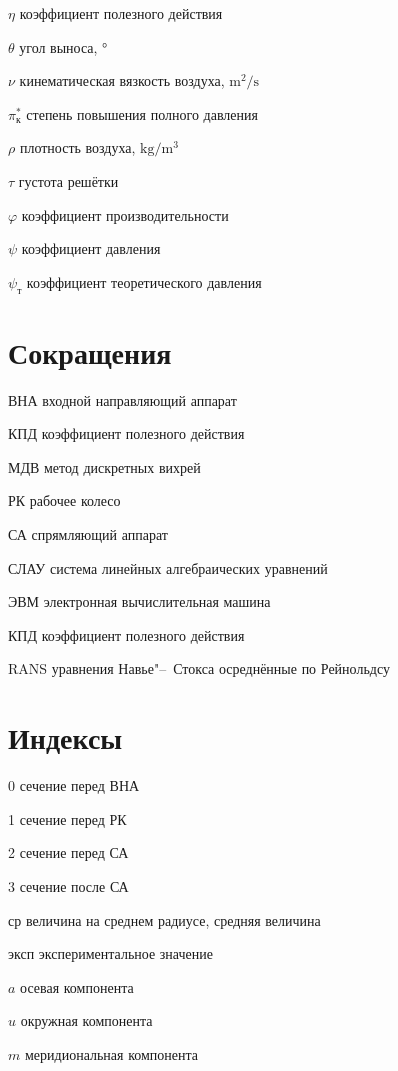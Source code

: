 \begin{eqexpl}[10mm]
\item{\(\eta\)} коэффициент полезного действия
\item{\(\theta\)} угол выноса, \(\si\degree\)
\item{\(\nu\)} кинематическая вязкость воздуха, $\si\meter^2/\si\second$
\item{\(\pi^{*}_\text{к}\)} степень повышения полного давления
\item{\(\rho\)} плотность воздуха, \(\si{\kilogram}/\si{\meter}^3\)
\item{\(\tau\)} густота решётки
\item{\(\varphi\)} коэффициент производительности
\item{\(\psi\)}	коэффициент давления
\item{\(\psi_{\text{т}}\)} коэффициент теоретического давления
\end{eqexpl}

\section*{Сокращения}
\begin{eqexpl}
	\item{ВНА} входной направляющий аппарат
	\item{КПД} коэффициент полезного действия
	\item{МДВ} метод дискретных вихрей
	\item{РК} рабочее колесо
	\item{СА} спрямляющий аппарат
	\item{СЛАУ} система линейных алгебраических уравнений
	\item{ЭВМ} электронная вычислительная машина
	\item{КПД} коэффициент полезного действия
	\item{RANS} уравнения Навье"--~Стокса осреднённые по Рейнольдсу
\end{eqexpl}

\section*{Индексы}
\begin{eqexpl}
	\item{0} сечение перед ВНА
	\item{1} сечение перед РК
	\item{2} сечение перед СА
	\item{3} сечение после СА
	\item{ср} величина на среднем радиусе, средняя величина
	\item{эксп} экспериментальное значение
	\item{\(a\)} осевая компонента
	\item{\(u\)} окружная компонента
	\item{\(m\)} меридиональная компонента
\end{eqexpl}

\FloatBarrier
